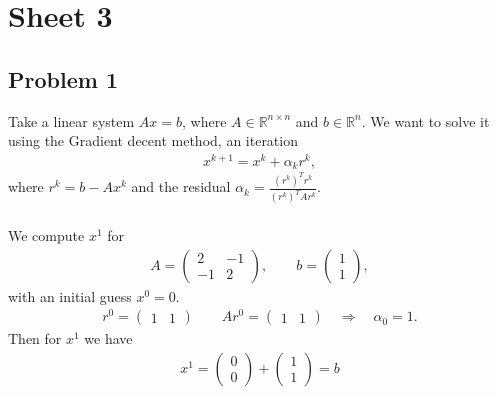 

\usepackage[final]{pdfpages}


\maketitle
\tableofcontents
\section{Sheet 3}
\subsection{Problem 1}
Take a linear system $Ax = b$, where $A \in \mathbb{R}^{n\times n}$ and $b
\in \mathbb{R}^{n}$. We want to solve it using the Gradient decent method, an
iteration
\begin{align}
    x^{k+1} = x^{k} + \alpha_k r^{k},
\end{align}
where $r^{k} = b - Ax^{k}$ and the residual $\alpha_k= \frac{(r^{k})^T
r^k}{(r^k)^T Ar^k}$.
\subsubsection{}
We compute $x^1$ for
\begin{align}
    A =
    \begin{pmatrix}
        2 & -1 \\
        -1 & 2
    \end{pmatrix},
    \qquad
        b = \begin{pmatrix}1 \\ 1 \end{pmatrix},
\end{align}
with an initial guess $x^0 = 0$.
\begin{align}
    r^0 = \begin{pmatrix} 1 & 1 \end{pmatrix} \qquad
    Ar^0 = \begin{pmatrix} 1 & 1 \end{pmatrix} \quad \Rightarrow \quad
    \alpha_0 = 1.
\end{align}
Then for $x^1$ we have
\begin{align}
    x^1 = \begin{pmatrix} 0 \\ 0 \end{pmatrix}  + \begin{pmatrix}1 \\
1 \end{pmatrix}  = b
\end{align}
